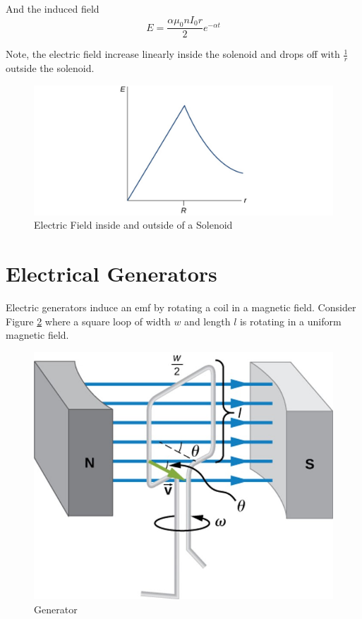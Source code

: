 \documentclass[14pt]{memoir}
\begin{document}
And the induced field 
\begin{equation}
E = \frac{\alpha \mu_0 n I_0 r}{2} e^{-\alpha t} 
\end{equation}

Note, the electric field increase linearly inside the solenoid and drops off with $\frac{1}{r}$ outside the solenoid. 

\begin{figure}[H]
\begin{center}
\includegraphics[scale=0.5]{fig/fig_13_19.jpg}
\caption{Electric Field inside and outside of a Solenoid}
\label{fig:13_19}
\end{center}
\end{figure}

\section{Electrical Generators}

Electric generators induce an emf by rotating a coil in a magnetic field. Consider Figure \ref{fig:13_28} where a square loop of width $w$ and length $l$ is rotating in a uniform magnetic field.

\begin{figure}[H]
\begin{center}
\includegraphics[scale=0.5]{fig/fig_13_28.jpg}
\caption{Generator}
\label{fig:13_28}
\end{center}
\end{figure}
\end{document}
